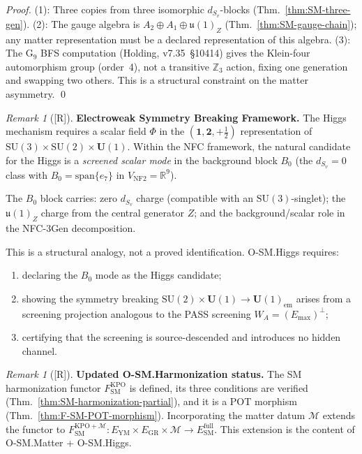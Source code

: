\documentclass[12pt,oneside]{amsbook}
\theoremstyle{plain}
\theoremstyle{definition}
\theoremstyle{remark}
\newtheorem{remark}[theorem]{Remark}
\newcommand{\status}[1]{\textup{[#1]}}
\begin{document}
\begin{proof}
(1): Three copies from three isomorphic $d_{S_v}$-blocks
(Thm.~\ref{thm:SM-three-gen}).
(2): The gauge algebra is $A_2 \oplus A_1 \oplus \mathfrak{u}(1)_Z$
(Thm.~\ref{thm:SM-gauge-chain}); any matter representation must
be a declared representation of this algebra.
(3): The G$_9$ BFS computation
(Holding, v7.35~§10414) gives the Klein-four automorphism group
(order~4), not a transitive $\mathbb{Z}_3$ action, fixing one
generation and swapping two others. This is a structural constraint
on the matter asymmetry. \qed
\end{proof}

\begin{remark}[\status{R}]\label{rem:SM-higgs-framework}
\textbf{Electroweak Symmetry Breaking Framework.}
The Higgs mechanism requires a scalar field $\Phi$ in the
$(\mathbf{1}, \mathbf{2}, +\tfrac{1}{2})$ representation of
$\mathrm{SU}(3) \times \mathrm{SU}(2) \times \mathbf{U}(1)$.
Within the NFC framework, the natural candidate for the Higgs
is a \emph{screened scalar mode} in the background block $B_0$
(the $d_{S_v} = 0$ class with $B_0 = \mathrm{span}\{e_7\}$ in
$V_{\mathrm{NF2}} = \mathbb{R}^9$).

The $B_0$ block carries: zero $d_{S_v}$ charge (compatible with
an $\mathrm{SU}(3)$-singlet); the $\mathfrak{u}(1)_Z$ charge
from the central generator $Z$; and the background/scalar role
in the NFC-3Gen decomposition.

This is a structural analogy, not a proved identification.
O-SM.Higgs requires:
\begin{enumerate}[label=\textup{(\arabic*)}]
 \item declaring the $B_0$ mode as the Higgs candidate;
 \item showing the symmetry breaking
 $\mathrm{SU}(2) \times \mathbf{U}(1) \to \mathbf{U}(1)_{\mathrm{em}}$
 arises from a screening projection analogous to the PASS
 screening $W_A = (E_{\max})^\perp$;
 \item certifying that the screening is source-descended and
 introduces no hidden channel.
\end{enumerate}
\end{remark}

\begin{remark}[\status{R}]
\textbf{Updated O-SM.Harmonization status.}
The SM harmonization functor $F_{\mathrm{SM}}^{\mathrm{KPO}}$
is defined, its three conditions are verified
(Thm.~\ref{thm:SM-harmonization-partial}), and it is a POT
morphism (Thm.~\ref{thm:F-SM-POT-morphism}). Incorporating the
matter datum $\mathcal{M}$ extends the functor to
$F_{\mathrm{SM}}^{\mathrm{KPO}+\mathcal{M}} : E_{\mathrm{YM}}
\times E_{\mathrm{GR}} \times \mathcal{M} \to E_{\mathrm{SM}}^{\mathrm{full}}$.
This extension is the content of O-SM.Matter + O-SM.Higgs.
\end{remark}
\end{document}
